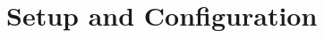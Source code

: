 \documentclass[compress,aspectratio=169]{beamer}
\begin{document}









\section{Setup and Configuration}
\end{document}
